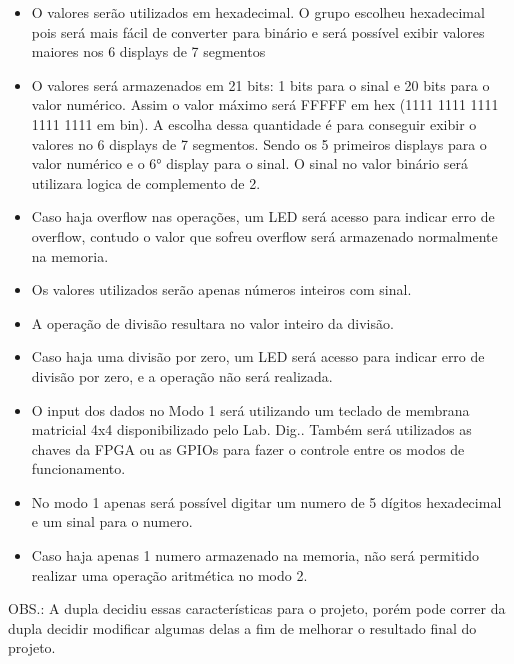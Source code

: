 \documentclass[12pt, a4paper]{article}
\begin{document}
	\begin{itemize}
		\item O valores serão utilizados em hexadecimal. O grupo escolheu hexadecimal pois será mais fácil de converter para binário e será possível
		exibir valores maiores nos 6 displays de 7 segmentos
		
		\item O valores será armazenados em 21 bits: 1 bits para o sinal e 20 bits para o valor numérico. Assim o valor máximo será FFFFF em 
		hex (1111 1111 1111 1111 1111 em bin). A escolha dessa quantidade é para conseguir exibir o valores no 6 displays de 7 segmentos. Sendo os 5
		primeiros displays para o valor numérico e o 6° display para o sinal. O sinal no valor binário será utilizara logica de complemento de 2.
		
		\item Caso haja overflow nas operações, um LED será acesso para indicar erro de overflow, contudo o valor que sofreu overflow será armazenado 
		normalmente na memoria.
		
		\item Os valores utilizados serão apenas números inteiros com sinal.
		
		\item A operação de divisão resultara no valor inteiro da divisão.
		
		\item Caso haja uma divisão por zero, um LED será acesso para indicar erro de divisão por zero, e a operação não será realizada.
		
		\item O input dos dados no Modo 1 será utilizando um teclado de membrana matricial 4x4 disponibilizado pelo Lab. Dig.. Também será utilizados 
		as chaves da FPGA ou as GPIOs para fazer o controle entre os modos de funcionamento.
		
		\item No modo 1 apenas será possível digitar um numero de 5 dígitos hexadecimal e um sinal para o numero. 
		
		\item Caso haja apenas 1 numero armazenado na memoria, não será permitido realizar uma operação aritmética no modo 2.
		
	\end{itemize}
	
	OBS.: A dupla decidiu essas características para o projeto, porém pode correr da dupla decidir modificar algumas delas a fim de melhorar o 
	resultado final do projeto.
	
\end{document}
